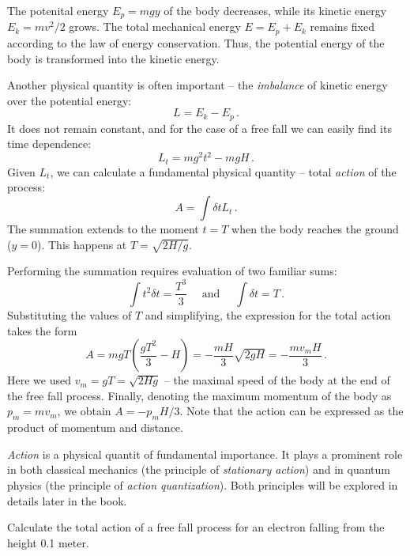The potenital energy $E_p=mgy$ of the body decreases, while its kinetic energy $E_k=mv^2/2$ grows. The total mechanical energy $E=E_p+E_k$ remains fixed according to the law of energy conservation. Thus, the potential energy of the body is transformed into the kinetic energy.

Another physical quantity is often important -- the \emph{imbalance} of kinetic energy over the potential energy:
\[
L = E_k - E_p\,.
\]
It does not remain constant, and for the case of a free fall we can easily find its time dependence:
\[
L_t = mg^2t^2 - mgH\,.
\]
Given $L_t$, we can calculate a fundamental physical quantity -- total \emph{action} of the process:
\[
A = \int\delta t L_t\,.
\]
The summation extends to the moment $t=T$ when the body reaches the ground ($y=0$). This happens at $T=\sqrt{2H/g}$.

Performing the summation requires evaluation of two familiar sums:
\[
\int t^2\delta t =\frac{T^3}{3}\quad\textrm{ and }\quad \int \delta t=T\,.
\]
Substituting the values of $T$ and simplifying, the expression for the total action takes the form
\[
A = mgT(\frac{gT^2}{3}-H)=-\frac{mH}{3}\sqrt{2gH}=-\frac{mv_{m}H}{3}\,.
\]
Here we used $v_m=gT=\sqrt{2Hg}$ -- the maximal speed of the body at the end of the free fall process. Finally, denoting the maximum momentum of the body as $p_m=mv_m$, we obtain $A=-p_m H/3$. Note that the action can be expressed as the product of momentum and distance.

\emph{Action} is a physical quantit of fundamental importance. It plays a prominent role in both classical mechanics (the principle of \emph{stationary action}) and in quantum physics (the principle of \emph{action quantization}). Both principles will be explored in details later in the book.

\begin{exercise}
	Calculate the total action of a free fall process for an electron falling from the height 0.1 meter.
\end{exercise}



